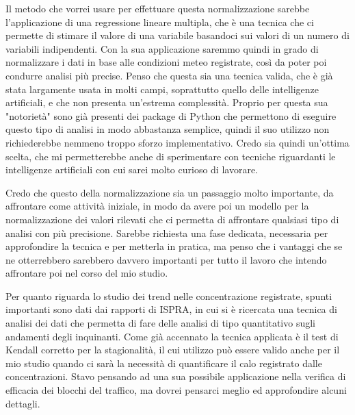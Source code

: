 \documentclass{article}
\begin{document}
Il metodo che vorrei usare per effettuare questa normalizzazione sarebbe l'applicazione di una regressione lineare multipla, che è una tecnica che ci permette di stimare il valore di una variabile basandoci sui valori di un numero di variabili indipendenti. Con la sua applicazione saremmo quindi in grado di normalizzare i dati in base alle condizioni meteo registrate, così da poter poi condurre analisi più precise. Penso che questa sia una tecnica valida, che è già stata largamente usata in molti campi, soprattutto quello delle intelligenze artificiali, e che non presenta un'estrema complessità. Proprio per questa sua "notorietà" sono già presenti dei package di Python che permettono di eseguire questo tipo di analisi in modo abbastanza semplice, quindi il suo utilizzo non richiederebbe nemmeno troppo sforzo implementativo. Credo sia quindi un'ottima scelta, che mi permetterebbe anche di sperimentare con tecniche riguardanti le intelligenze artificiali con cui sarei molto curioso di lavorare.

Credo che questo della normalizzazione sia un passaggio molto importante, da affrontare come attività iniziale, in modo da avere poi un modello per la normalizzazione dei valori rilevati che ci permetta di affrontare qualsiasi tipo di analisi con più precisione. Sarebbe richiesta una fase dedicata, necessaria per approfondire la tecnica e per metterla in pratica, ma penso che i vantaggi che se ne otterrebbero sarebbero davvero importanti per tutto il lavoro che intendo affrontare poi nel corso del mio studio.

Per quanto riguarda lo studio dei trend nelle concentrazione registrate, spunti importanti sono dati dai rapporti di ISPRA\cite{cattani2018analisi}\cite{cattani2014analisi}, in cui si è ricercata una tecnica di analisi dei dati che permetta di fare delle analisi di tipo quantitativo sugli andamenti degli inquinanti. Come già accennato la tecnica applicata è il test di Kendall corretto per la stagionalità, il cui utilizzo può essere valido anche per il mio studio quando ci sarà la necessità di quantificare il calo registrato dalle concentrazioni. Stavo pensando ad una sua possibile applicazione nella verifica di efficacia dei blocchi del traffico, ma dovrei pensarci meglio ed approfondire alcuni dettagli.
\end{document}
